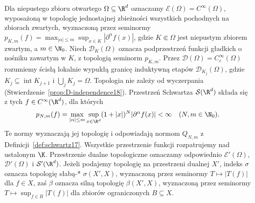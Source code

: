 \begin{definicja}
\label{def:trzy-przestrzenie25}
Dla niepustego zbioru otwartego $\Omega\subseteq\R^d$ oznaczamy
$\mathcal E(\Omega)=C^\infty(\Omega)$, wyposażoną w topologię
jednostajnej zbieżności wszystkich pochodnych na zbiorach zwartych,
wyznaczoną przez seminormy
$p_{K,m}(f)=\max_{|\alpha|\le m}\sup_{x\in K}|\partial^\alpha f(x)|$,
gdzie $K\Subset\Omega$ jest niepustym zbiorem zwartym,
a $m\in\N_0$. Niech $\mathcal D_K(\Omega)$ oznacza podprzestrzeń
funkcji gładkich o nośniku zawartym w $K$, z topologią
seminorm $p_{K,m}$. Przez $\mathcal D(\Omega)=C_c^\infty(\Omega)$
rozumiemy ścisłą lokalnie wypukłą granicę induktywną
etapów $\mathcal D_{K_j}(\Omega)$, gdzie
$K_j\subseteq\operatorname{int}K_{j+1}$ i $\bigcup_jK_j=\Omega$.
Topologia nie zależy od wyczerpania
(Stwierdzenie~\ref{prop:D-independence18}).
Przestrzeń Schwartza $\mathcal S(\R^d)$ składa się z
tych $f\in C^\infty(\R^d)$, dla których
\[
 p_{N,m}(f)=\max_{|\alpha|\le m}\sup_{x\in\R^d}
 (1+|x|)^N|\partial^\alpha f(x)|<\infty
 \quad(N,m\in\N_0).
\]
Te normy wyznaczają jej topologię i odpowiadają normom
$Q_{N,m}$ z Definicji~\ref{def:schwartz17}.
Wszystkie przestrzenie funkcji rozpatrujemy nad ustalonym $\K$.
Przestrzenie dualne topologiczne oznaczamy odpowiednio
$\mathcal E'(\Omega)$, $\mathcal D'(\Omega)$ i
$\mathcal S'(\R^d)$. Jeżeli podajemy topologię na przestrzeni
 dualnej $X'$, indeks $\sigma$ oznacza topologię słabą-*
 $\sigma(X',X)$, wyznaczoną przez seminormy $T\mapsto|T(f)|$
 dla $f\in X$, zaś $\beta$ oznacza silną topologię
 $\beta(X',X)$, wyznaczoną przez seminormy
 $T\mapsto\sup_{f\in B}|T(f)|$ dla zbiorów ograniczonych $B\subseteq X$.
\end{definicja}


